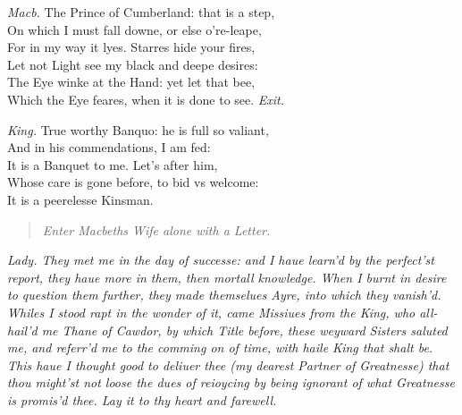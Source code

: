 \documentclass[12pt]{sides}
\newcommand{\StageDir}[1]{\begin{quote}\centering\em #1\end{quote}}
\newcommand{\dia}[1]{\hskip 15pt\textit{#1}\hskip 6pt}
\begin{document}
\begin{multicols}{2}
            \dia{Macb.} The Prince of Cumberland: that is a step, \\ On which I must fall downe, or else o're-leape, \\ For in my way it lyes. Starres hide your fires, \\ Let not Light see my black and deepe desires: \\ The Eye winke at the Hand: yet let that bee, \\ Which the Eye feares, when it is done to see. \hfill \textit{Exit.}

            \dia{King.} True worthy Banquo: he is full so valiant, \\ And in his commendations, I am fed: \\ It is a Banquet to me. Let's after him, \\ Whose care is gone before, to bid vs welcome: \\ It is a peerelesse Kinsman. 
            \StageDir{Enter Macbeths Wife alone with a Letter.}

            \dia{\textnormal{Lady.} They met me in the day of successe: and I haue learn'd by the perfect'st report, they haue more in them, then mortall knowledge. When I burnt in desire to question them further, they made themselues Ayre, into which they vanish'd. Whiles I stood rapt in the wonder of it, came Missiues from the King, who all-hail'd me Thane of Cawdor, by which Title before, these weyward Sisters saluted me, and referr'd me to the comming on of time, with haile King that shalt be. This haue I thought good to deliuer thee (my dearest Partner of Greatnesse) that thou might'st not loose the dues of reioycing by being ignorant of what Greatnesse is promis'd thee. Lay it to thy heart and farewell.}
            

\end{multicols}
\end{document}
